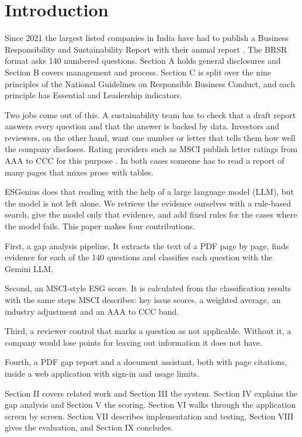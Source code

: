\documentclass[conference]{IEEEtran}
\begin{document}
\section{Introduction}
Since 2021 the largest listed companies in India have had to publish a Business Responsibility and Sustainability Report with their annual report \cite{b1}. The BRSR format asks 140 numbered questions. Section A holds general disclosures and Section B covers management and process. Section C is split over the nine principles of the National Guidelines on Responsible Business Conduct, and each principle has Essential and Leadership indicators.

Two jobs come out of this. A sustainability team has to check that a draft report answers every question and that the answer is backed by data. Investors and reviewers, on the other hand, want one number or letter that tells them how well the company discloses. Rating providers such as MSCI publish letter ratings from AAA to CCC for this purpose \cite{b2}. In both cases someone has to read a report of many pages that mixes prose with tables.

ESGenius does that reading with the help of a large language model (LLM), but the model is not left alone. We retrieve the evidence ourselves with a rule-based search, give the model only that evidence, and add fixed rules for the cases where the model fails. This paper makes four contributions.

First, a gap analysis pipeline. It extracts the text of a PDF page by page, finds evidence for each of the 140 questions and classifies each question with the Gemini LLM.

Second, an MSCI-style ESG score. It is calculated from the classification results with the same steps MSCI describes: key issue scores, a weighted average, an industry adjustment and an AAA to CCC band.

Third, a reviewer control that marks a question as not applicable. Without it, a company would lose points for leaving out information it does not have.

Fourth, a PDF gap report and a document assistant, both with page citations, inside a web application with sign-in and usage limits.

Section II covers related work and Section III the system. Section IV explains the gap analysis and Section V the scoring. Section VI walks through the application screen by screen. Section VII describes implementation and testing, Section VIII gives the evaluation, and Section IX concludes.
\end{document}
